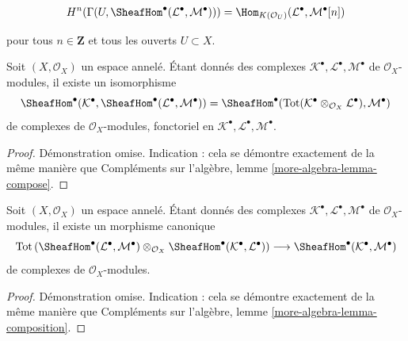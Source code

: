 {\begin{equation}
\label{equation-cohomology-hom-complex}
H^n(\Gamma(U, \SheafHom^\bullet(\mathcal{L}^\bullet, \mathcal{M}^\bullet))) =
\Hom_{K(\mathcal{O}_U)}(\mathcal{L}^\bullet, \mathcal{M}^\bullet[n])
\end{equation}

pour tous $n \in \mathbf{Z}$ et tous les ouverts $U \subset X$.

\begin{lemma}

\label{lemma-compose}
Soit $(X, \mathcal{O}_X)$ un espace annelé. Étant donnés des complexes $\mathcal{K}^\bullet, \mathcal{L}^\bullet, \mathcal{M}^\bullet$ de $\mathcal{O}_X$-modules, il existe un isomorphisme $$
\SheafHom^\bullet(\mathcal{K}^\bullet,
\SheafHom^\bullet(\mathcal{L}^\bullet, \mathcal{M}^\bullet))
=
\SheafHom^\bullet(\text{Tot}(\mathcal{K}^\bullet \otimes_{\mathcal{O}_X}
\mathcal{L}^\bullet), \mathcal{M}^\bullet)
$$ de complexes de $\mathcal{O}_X$-modules, fonctoriel en $\mathcal{K}^\bullet, \mathcal{L}^\bullet, \mathcal{M}^\bullet$.
\end{lemma}

\begin{proof}
Démonstration omise. Indication : cela se démontre exactement de la même manière que Compléments sur l'algèbre, lemme \ref{more-algebra-lemma-compose}.
\end{proof}

\begin{lemma}

\label{lemma-composition}
Soit $(X, \mathcal{O}_X)$ un espace annelé. Étant donnés des complexes $\mathcal{K}^\bullet, \mathcal{L}^\bullet, \mathcal{M}^\bullet$ de $\mathcal{O}_X$-modules, il existe un morphisme canonique $$
\text{Tot}\left(
\SheafHom^\bullet(\mathcal{L}^\bullet, \mathcal{M}^\bullet)
\otimes_{\mathcal{O}_X}
\SheafHom^\bullet(\mathcal{K}^\bullet, \mathcal{L}^\bullet)
\right)
\longrightarrow
\SheafHom^\bullet(\mathcal{K}^\bullet, \mathcal{M}^\bullet)
$$ de complexes de $\mathcal{O}_X$-modules.
\end{lemma}

\begin{proof}
Démonstration omise. Indication : cela se démontre exactement de la même manière que Compléments sur l'algèbre, lemme \ref{more-algebra-lemma-composition}.
\end{proof}

\begin{lemma}

\label{lemma-diagonal-better}


\end{lemma}}
